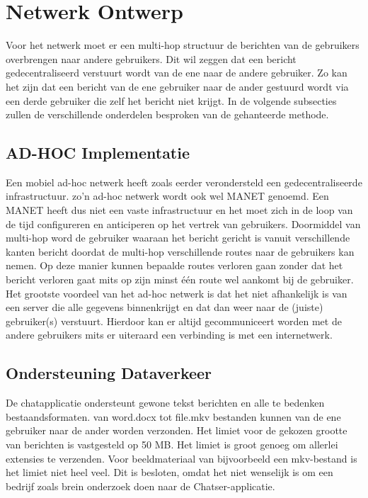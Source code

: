 \documentclass[12pt]{article}
\begin{document}
\section{Netwerk Ontwerp}
Voor het netwerk moet er een multi-hop structuur de berichten van de gebruikers overbrengen naar andere gebruikers. Dit wil zeggen dat een bericht gedecentraliseerd verstuurt wordt van de ene naar de andere gebruiker. Zo kan het zijn dat een bericht van de ene gebruiker naar de ander gestuurd wordt via een derde gebruiker die zelf het bericht niet krijgt. In de volgende subsecties zullen de verschillende onderdelen besproken van de gehanteerde methode. 

\subsection{AD-HOC Implementatie}
Een mobiel ad-hoc netwerk heeft zoals eerder verondersteld een gedecentraliseerde infrastructuur. zo'n ad-hoc netwerk wordt ook wel MANET genoemd. Een MANET heeft dus niet een vaste infrastructuur en het moet zich in de loop van de tijd configureren en anticiperen op het vertrek van gebruikers. Doormiddel van multi-hop  word de gebruiker waaraan het bericht gericht is vanuit verschillende kanten bericht doordat de multi-hop verschillende routes naar de gebruikers kan nemen. Op deze manier kunnen bepaalde routes verloren gaan zonder dat het bericht verloren gaat mits op zijn minst \'e\'en route wel aankomt bij de gebruiker. Het grootste voordeel van het ad-hoc netwerk is dat het niet afhankelijk is van een server die alle gegevens binnenkrijgt en dat dan weer naar de (juiste) gebruiker(s) verstuurt. Hierdoor kan er altijd gecommuniceert worden met de andere gebruikers mits er uiteraard een verbinding is met een internetwerk.

\subsection{Ondersteuning Dataverkeer}
De chatapplicatie ondersteunt gewone tekst berichten en alle te bedenken bestaandsformaten. van word.docx tot file.mkv bestanden kunnen van de ene gebruiker naar de ander worden verzonden. Het limiet voor de gekozen grootte van berichten is vastgesteld op 50 MB. Het limiet is groot genoeg om allerlei extensies te verzenden. Voor beeldmateriaal van bijvoorbeeld een mkv-bestand is het limiet niet heel veel. Dit is besloten, omdat het niet wenselijk is om een bedrijf zoals brein onderzoek doen naar de Chatser-applicatie\small\textcopyright.
\end{document}
